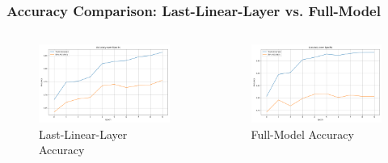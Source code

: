 \documentclass{beamer}
\begin{document}
\begin{frame}
\frametitle{Accuracy Comparison: Last-Linear-Layer vs. Full-Model}
\centering
\begin{columns}
  \begin{figure}
    \includegraphics[width=\textwidth]{last-linear-layer/accuracy_metrics.png}
    \caption{Last-Linear-Layer Accuracy}
  \end{figure}
  \begin{figure}
    \includegraphics[width=\textwidth]{full-model/accuracy_metrics.png}
    \caption{Full-Model Accuracy}
  \end{figure}
\end{columns}
\end{frame}
\end{document}
